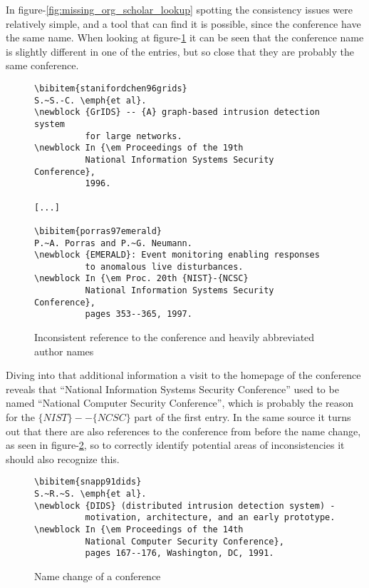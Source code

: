
In figure-\ref{fig:missing_org_scholar_lookup} spotting the
consistency issues were relatively simple, and a tool that can find it
is possible, since the conference have the same name.  When looking at
figure-\ref{fig:entry_journal_name_authors} it can be seen that the
conference name is slightly different in one of the entries, but so
close that they are probably the same conference.

\begin{figure}[ht]
  \centering
\begin{small}
\begin{verbatim}
\bibitem{stanifordchen96grids}
S.~S.-C. \emph{et al}.
\newblock {GrIDS} -- {A} graph-based intrusion detection system 
          for large networks.
\newblock In {\em Proceedings of the 19th
          National Information Systems Security Conference},
          1996.

[...]

\bibitem{porras97emerald}
P.~A. Porras and P.~G. Neumann.
\newblock {EMERALD}: Event monitoring enabling responses 
          to anomalous live disturbances.
\newblock In {\em Proc. 20th {NIST}-{NCSC}
          National Information Systems Security Conference},
          pages 353--365, 1997.

\end{verbatim}
\end{small}
  \caption{Inconsistent reference to the conference and heavily abbreviated author names}
\label{fig:entry_journal_name_authors}
\end{figure}

Diving into that additional information a visit to the homepage of the
conference reveals that ``National Information Systems Security
Conference'' used to be named ``National Computer Security
Conference'', which is probably the reason for the
$\{NIST\}--\{NCSC\}$ part of the first entry\cite{nist2014_nissc}.  In
the same source it turns out that there are also references to the
conference from before the name change, as seen in
figure-\ref{fig:conference_name}, so to correctly identify potential
areas of inconsistencies it should also recognize this.

\begin{figure}[ht]
  \centering
\begin{small}
\begin{verbatim}
\bibitem{snapp91dids}
S.~R.~S. \emph{et al}.
\newblock {DIDS} (distributed intrusion detection system) -
          motivation, architecture, and an early prototype.
\newblock In {\em Proceedings of the 14th
          National Computer Security Conference},
          pages 167--176, Washington, DC, 1991.
\end{verbatim}
\end{small}
  \caption{Name change of a conference}
\label{fig:conference_name}
\end{figure}

